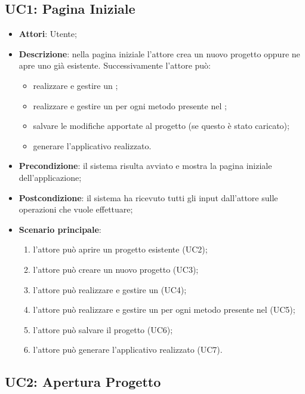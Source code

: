 \subsection{UC1: Pagina Iniziale}
\label{UC1}
\begin{itemize}
\item \textbf{Attori}: Utente;
\item \textbf{Descrizione}: nella pagina iniziale l'attore crea un nuovo progetto oppure ne apre uno già esistente.
Successivamente l'attore può:
	\begin{itemize}
	\item realizzare e gestire un ;
	\item realizzare e gestire un  per ogni metodo presente nel ;
	\item salvare le modifiche apportate al progetto (se questo è stato caricato);
	\item generare l'applicativo realizzato.
	\end{itemize}
\item \textbf{Precondizione}: il sistema risulta avviato e mostra la pagina iniziale dell'applicazione;
\item \textbf{Postcondizione}: il sistema ha ricevuto tutti gli input dall'attore sulle operazioni che vuole effettuare;
\item \textbf{Scenario principale}:
	\begin{enumerate}
	\item l'attore può aprire un progetto esistente (UC2);
	\item l'attore può creare un nuovo progetto (UC3);
	\item l'attore può realizzare e gestire un  (UC4);
	\item l'attore può realizzare e gestire un  per ogni metodo presente nel  (UC5);
	\item l'attore può salvare il progetto (UC6);
	\item l'attore può generare l'applicativo realizzato (UC7).
	\end{enumerate}

\end{itemize}

\subsection{UC2: Apertura Progetto}
\label{UC2}

